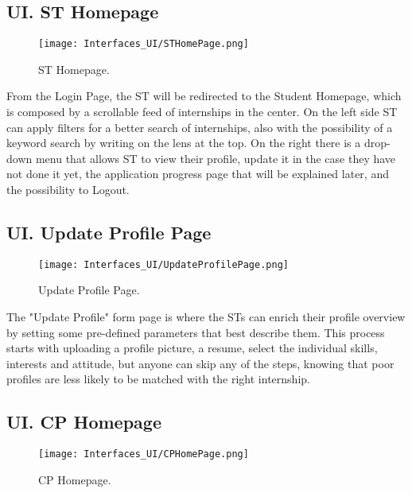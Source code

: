 \subsection*{UI\cui . ST Homepage}

\begin{figure}[H]
    \begin{center}
        \texttt{[image: Interfaces\_UI/STHomePage.png]}
        \caption{ST Homepage.}
        \label{fig:st_homepage}%
    \end{center}
\end{figure}

From the Login Page, the ST will be redirected to the Student Homepage, which is composed by a scrollable feed of internships in the center. On the left side ST can apply filters for a better search of internships, also with the possibility of a keyword search by writing on the lens at the top. On the right there is a drop-down menu that allows ST to view their profile, update it in the case they have not done it yet, the application progress page that will be explained later, and the possibility to Logout.

\subsection*{UI\cui . Update Profile Page}

\begin{figure}[H]
    \begin{center}
        \texttt{[image: Interfaces\_UI/UpdateProfilePage.png]}
        \caption{Update Profile Page.}
        \label{fig:update_profile_page}%
    \end{center}
\end{figure}

The "Update Profile" form page is where the STs can enrich their profile overview by setting some pre-defined parameters that best describe them. This process starts with uploading a profile picture, a resume, select the individual skills, interests and attitude, but anyone can skip any of the steps, knowing that poor profiles are less likely to be matched with the right internship.

\subsection*{UI\cui . CP Homepage}

\begin{figure}[H]
    \begin{center}
        \texttt{[image: Interfaces\_UI/CPHomePage.png]}
        \caption{CP Homepage.}
        \label{fig:company_homepage}%
    \end{center}
\end{figure}

